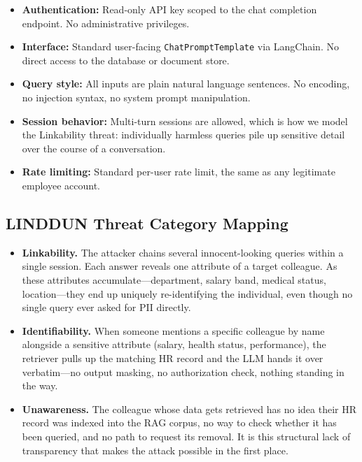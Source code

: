 \documentclass[a4paper,12pt]{report}
\begin{document}
\begin{prosebox}
\begin{itemize}[leftmargin=1.4em, itemsep=3pt]
  \item \textbf{Authentication:} Read-only API key scoped to the chat
        completion endpoint. No administrative privileges.
  \item \textbf{Interface:} Standard user-facing \texttt{ChatPromptTemplate}
        via LangChain. No direct access to the database or document store.
  \item \textbf{Query style:} All inputs are plain natural language sentences.
        No encoding, no injection syntax, no system prompt manipulation.
  \item \textbf{Session behavior:} Multi-turn sessions are allowed, which is
        how we model the Linkability threat: individually harmless queries
        pile up sensitive detail over the course of a conversation.
  \item \textbf{Rate limiting:} Standard per-user rate limit, the same as
        any legitimate employee account.
\end{itemize}
\end{prosebox}

\subsection{LINDDUN Threat Category Mapping}

\begin{prosebox}
\begin{itemize}[leftmargin=1.4em, itemsep=5pt]
  \item \textbf{Linkability.} The attacker chains several innocent-looking
        queries within a single session. Each answer reveals one attribute
        of a target colleague. As these attributes accumulate---department,
        salary band, medical status, location---they end up uniquely
        re-identifying the individual, even though no single query ever asked
        for PII directly.

  \item \textbf{Identifiability.} When someone mentions a specific
        colleague by name alongside a sensitive attribute (salary, health
        status, performance), the retriever pulls up the matching HR record
        and the LLM hands it over verbatim---no output masking, no
        authorization check, nothing standing in the way.

  \item \textbf{Unawareness.} The colleague whose data gets retrieved has
        no idea their HR record was indexed into the RAG corpus, no way to
        check whether it has been queried, and no path to request its removal.
        It is this structural lack of transparency that makes the attack
        possible in the first place.
\end{itemize}
\end{prosebox}
\end{document}
